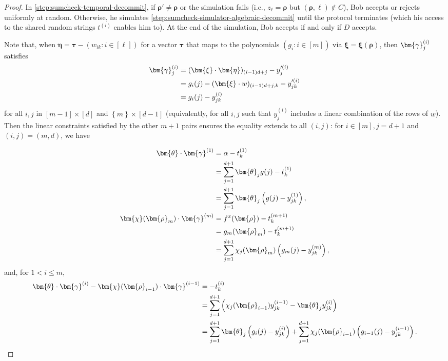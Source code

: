 \documentclass[10pt,a4paper]{article}
\theoremstyle{definition}
\renewcommand{\set}[1]{\left\{#1\right\}}
\newcommand{\vcommitstring}{z}
\newcommand{\pcommitstring}{y}
\newcommand{\dimension}{m}
\newcommand{\degree}{d}
\newcommand{\fingerprinttuple}{\bm{\rho}}
\def\fe#1{
    \ifnum#1=1
        \alpha
    \else
    \ifnum#1=2
        \beta
    \else
    \ifnum#1=3
        \gamma
    \fi\fi\fi
}
\begin{document}
\begin{proof}
    In \cref{step:sumcheck-temporal-decommit}, if $\fingerprinttuple' \neq \fingerprinttuple$ or the simulation fails (i.e., $\vcommitstring_\ell = \fingerprinttuple$ but $(\fingerprinttuple, \ell) \notin C$), Bob accepts or rejects uniformly at random. Otherwise, he simulates \cref{step:sumcheck-simulator-algebraic-decommit} until the protocol terminates (which his access to the shared random strings $t^{(i)}$ enables him to).
    At the end of the simulation, Bob accepts if and only if $D$ accepts.
    
    Note that, when $\bm{\eta} = \bm{\tau} - (w_{ik} : i \in [\ell])$ for a vector $\bm{\tau}$ that maps to the polynomials $(g_i : i \in [\dimension])$ via $\bm{\xi} = \bm{\xi}(\fingerprinttuple)$, then $\bm{\fe3}^{(i)}_j$ satisfies
    \begin{align*}
        \bm{\fe3}^{(i)}_j &= (\bm{\xi} \cdot \bm{\eta})_{(i - 1) \degree + j} -  \pcommitstring'^{(i)}_j\\
        &= g_i(j) - (\bm{\xi} \cdot w)_{(i - 1) \degree + j, k} - \pcommitstring'^{(i)}_{jk}\\
        &= g_i(j) - \pcommitstring^{(i)}_{jk}
    \end{align*}
    for all $i,j$ in $[\dimension - 1] \times [\degree]$ and $\set{\dimension} \times [\degree - 1]$ (equivalently, for all $i,j$ such that $\pcommitstring^{(i)}_j$ includes a linear combination of the rows of $w$). Then the linear constraints satisfied by the other $\dimension + 1$ pairs ensures the equality extends to all $(i, j)$: for $i \in [\dimension], j = \degree + 1$ and $(i, j) = (\dimension, \degree)$, we have
    
    \begin{align*}
        \bm{\theta} \cdot \bm{\fe3}^{(1)} &= \fe1 - t_k^{(1)}\\
        &= \sum_{j = 1}^{\degree + 1} \bm{\theta}_j g(j) - t_k^{(1)}\\
        &= \sum_{j = 1}^{\degree + 1} \bm{\theta}_j \left(g(j) - \pcommitstring_{jk}^{(1)}\right),\\
        \bm{\chi}(\fingerprinttuple_\dimension) \cdot \bm{\fe3}^{(\dimension)} &= f^x(\fingerprinttuple) - t_k^{(\dimension+1)}\\
        &= g_\dimension(\fingerprinttuple_\dimension) - t_k^{(\dimension+1)}\\
        &= \sum_{j = 1}^{\degree + 1} \chi_j(\fingerprinttuple_\dimension) \left(g_\dimension(j) - \pcommitstring^{(\dimension)}_{jk}\right),
    \end{align*}
    and, for $1 < i \leq \dimension$,
    \begin{align*}
        \bm{\theta} \cdot \bm{\fe3}^{(i)} - \bm{\chi}(\fingerprinttuple_{i-1}) \cdot \bm{\fe3}^{(i-1)} &= -t_k^{(i)}\\
        &= \sum_{j = 1}^{\degree + 1} \left(\chi_j(\fingerprinttuple_{i-1}) \pcommitstring^{(i-1)}_{jk} - \bm{\theta}_j \pcommitstring^{(i)}_{jk}\right)\\
         &= \sum_{j = 1}^{\degree + 1} \bm{\theta}_j \left(g_i(j)- \pcommitstring^{(i)}_{jk}\right) + \sum_{j = 1}^{\degree + 1} \chi_j(\fingerprinttuple_{i-1}) \left(g_{i-1}(j)- \pcommitstring^{(i-1)}_{jk}\right).
    \end{align*}
    

\end{proof}
\end{document}
